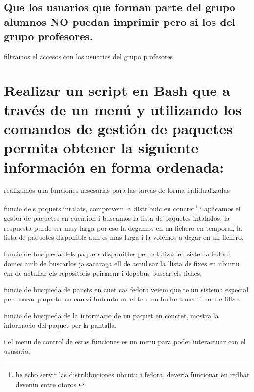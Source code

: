 \documentclass[preprint,11pt]{elsarticle}
\begin{document}
\subsection{Que los usuarios que forman parte del grupo alumnos NO puedan imprimir pero si los del grupo profesores.}
filtramos el accesos con los usuarios del grupo profesores 


\clearpage
\section{Realizar un script en Bash que a través de un menú y utilizando los comandos de gestión de paquetes permita obtener la siguiente información en forma ordenada:}

realizamos una funciones nesesarias para las tareas de forma indidualizadas\smallskip

funcio dels paquets intalats, comprovem la distribuic en concret\footnote{he echo servir las distribbuciones ubuntu i fedora, deveria funcionar en redhat devenin entre otoros.} i aplicamos el gestor de paquetes en cuention i buscamos la lista de paquetes intalados, la respuesta puede ser muy larga por eso la degamos en un fichero en temporal, la lista de paquetes disponible aun es mas larga i la volemos a degar en un fichero. 
\smallskip

funcio de busqueda dels paquets disponibles per actulizar en sistema fedora domes amb de buscarlos ja sacaraga ell de actulisar la llista de fixes en ubuntu em de actuliar els repositoris peirmenr i depebus buscar els fiches. 
\smallskip


funcio de busqueda de pauets en auet cas fedora veiem que te un sistema especial per buscar paquets, en camvi hubunto no el te o no ho he trobat i em de filtar. 
\smallskip


\clearpage
funcio de busqueda de la informacio de un paquet en concret, mostra la informacio del paquet per la pantalla.
\smallskip

i el menu de control de estas funciones es un menu para poder interactuar con el ususario. 
\smallskip
\end{document}
